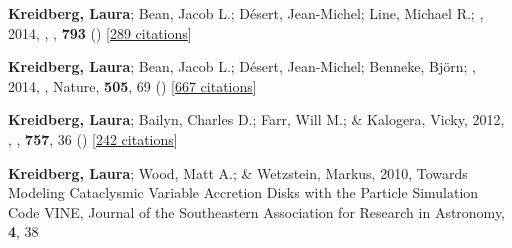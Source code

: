 \item[{\color{numcolor}\scriptsize4}] \textbf{Kreidberg, Laura}; Bean, Jacob L.; D{\'e}sert, Jean-Michel; Line, Michael R.; \etal, 2014, , \apj, \textbf{793} () [\href{https://ui.adsabs.harvard.edu/abs/2014ApJ...793L..27K}{289 citations}]

\item[{\color{numcolor}\scriptsize3}] \textbf{Kreidberg, Laura}; Bean, Jacob L.; D{\'e}sert, Jean-Michel; Benneke, Bj{\"o}rn; \etal, 2014, , Nature, \textbf{505}, 69 () [\href{https://ui.adsabs.harvard.edu/abs/2014Natur.505...69K}{667 citations}]

\item[{\color{numcolor}\scriptsize2}] \textbf{Kreidberg, Laura}; Bailyn, Charles D.; Farr, Will M.; \& Kalogera, Vicky, 2012, , \apj, \textbf{757}, 36 () [\href{https://ui.adsabs.harvard.edu/abs/2012ApJ...757...36K}{242 citations}]

\item[{\color{numcolor}\scriptsize1}] \textbf{Kreidberg, Laura}; Wood, Matt A.; \& Wetzstein, Markus, 2010, Towards Modeling Cataclysmic Variable Accretion Disks with the Particle Simulation Code VINE, Journal of the Southeastern Association for Research in Astronomy, \textbf{4}, 38